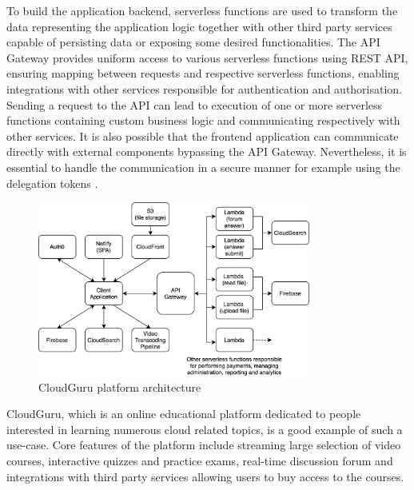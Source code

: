 To build the application backend, serverless functions are used to transform the data representing the application logic together with other third party services capable of persisting data or exposing some desired functionalities. The API Gateway provides uniform access to various serverless functions using REST API, ensuring mapping between requests and respective serverless functions, enabling integrations with other services responsible for authentication and authorisation. Sending a request to the API can lead to execution of one or more serverless functions containing custom business logic and communicating respectively with other services. It is also possible that the frontend application can communicate directly with external components bypassing the API Gateway. Nevertheless, it is essential to handle the communication in a secure manner for example using the delegation tokens \cite{ServerlessArchitectureOnAWS}.

\begin{figure}[h]
    \centering
    \includegraphics[width=0.8\textwidth]{assets/02-serverless/CloudGuruArchitecture.png}
    \caption{CloudGuru platform architecture}
    \label{fig:cloudguru-architecture-diagram}
\end{figure}

CloudGuru, which is an online educational platform dedicated to people interested in learning numerous cloud related topics, is a good example of such a use-case. Core features of the platform include streaming large selection of video courses, interactive quizzes and practice exams, real-time discussion forum and integrations with third party services allowing users to buy access to the courses.

